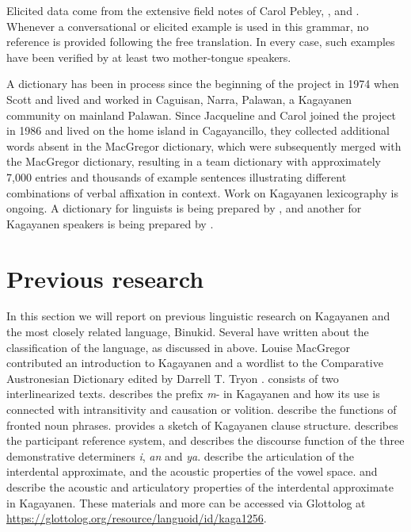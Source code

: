 Elicited data come from the extensive field notes of Carol Pebley, , and . Whenever a conversational or elicited example is used in this grammar, no reference is provided following the free translation. In every case, such examples have been verified by at least two mother-tongue speakers. 

A dictionary has been in process since the beginning of the project in 1974 when Scott and  lived and worked in Caguisan, Narra, Palawan, a Kagayanen community on mainland Palawan. Since Jacqueline and Carol joined the project in 1986 and lived on the home island in Cagayancillo, they collected additional words absent in the MacGregor dictionary, which were subsequently merged with the MacGregor dictionary, resulting in a team dictionary with approximately 7,000 entries and thousands of example sentences illustrating different combinations of verbal affixation in context. Work on Kagayanen lexicography is ongoing. A dictionary for linguists is being prepared by , and another for Kagayanen speakers is being prepared by .

\section{Previous research}\label{sec:1.5} \label{sec:previousresearch}

In this section we will report on previous linguistic research on Kagayanen and the most closely related language, Binukid. Several have written about the classification of the language, as discussed in  above. Louise MacGregor \citep{macgregor1995} contributed an introduction to Kagayanen and a wordlist to the Comparative Austronesian Dictionary edited by Darrell T. Tryon \citep{tryon1995}. \citet{macgregor1999} consists of two interlinearized texts. \citet{pebley1998} describes the prefix \textit{m}- in Kagayanen and how its use is connected with intransitivity and causation or volition. \citet{pebleyfunctions1999} describe the functions of fronted noun phrases. \citet{pebleysketch1999} provides a sketch of Kagayanen clause structure. \citet{pebleyparticipant1999} describes the participant reference system, and \citet{pebleyenclitic1999} describes the discourse function of the three demonstrative determiners \textit{i}, \textit{an} and \textit{ya}.
\citet{olson2010} describe the articulation of the interdental approximate, and the acoustic properties of the vowel space. \citet{olson2007a} and \citet{olson2008} describe the acoustic and articulatory properties of the interdental approximate in Kagayanen. These materials and more can be accessed via Glottolog at \url{https://glottolog.org/resource/languoid/id/kaga1256}.

